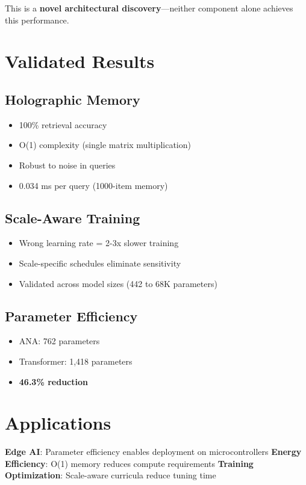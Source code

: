 \documentclass[10pt]{article}
\begin{document}
This is a \textbf{novel architectural discovery}—neither component alone achieves this performance.

\section{Validated Results}

\subsection{Holographic Memory}
\begin{itemize}
    \item 100\% retrieval accuracy
    \item O(1) complexity (single matrix multiplication)
    \item Robust to noise in queries
    \item 0.034 ms per query (1000-item memory)
\end{itemize}

\subsection{Scale-Aware Training}
\begin{itemize}
    \item Wrong learning rate = 2-3x slower training
    \item Scale-specific schedules eliminate sensitivity
    \item Validated across model sizes (442 to 68K parameters)
\end{itemize}

\subsection{Parameter Efficiency}
\begin{itemize}
    \item ANA: 762 parameters
    \item Transformer: 1,418 parameters
    \item \textbf{46.3\% reduction}
\end{itemize}

\section{Applications}

\textbf{Edge AI}: Parameter efficiency enables deployment on microcontrollers
\textbf{Energy Efficiency}: O(1) memory reduces compute requirements
\textbf{Training Optimization}: Scale-aware curricula reduce tuning time
\end{document}
